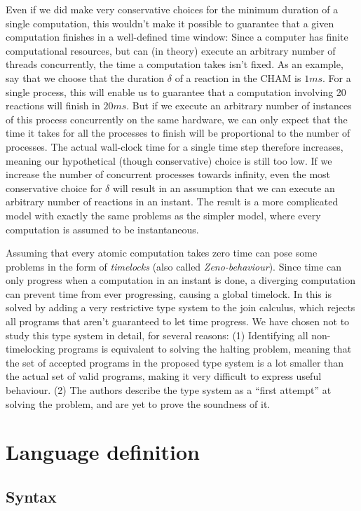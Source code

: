 Even if we did make very conservative choices for the minimum duration
of a single computation, this wouldn't make it possible to guarantee
that a given computation finishes in a well-defined time window: Since
a computer has finite computational resources, but can (in theory)
execute an arbitrary number of threads concurrently, the time a
computation takes isn't fixed. As an example, say that we choose that
the duration $\delta$ of a reaction in the CHAM is $1 ms$. For a
single process, this will enable us to guarantee that a computation
involving 20 reactions will finish in $20 ms$. But if we execute an
arbitrary number of instances of this process concurrently on the same
hardware, we can only expect that the time it takes for all the
processes to finish will be proportional to the number of processes.
The actual wall-clock time for a single time step therefore increases,
meaning our hypothetical (though conservative) choice is still too
low. If we increase the number of concurrent processes towards
infinity, even the most conservative choice for $\delta$ will result
in an assumption that we can execute an arbitrary number of reactions
in an instant. The result is a more complicated model with exactly the
same problems as the simpler model, where every computation is assumed
to be instantaneous.

Assuming that every atomic computation takes zero time can pose some
problems in the form of \emph{timelocks} (also called
\emph{Zeno-behaviour}). Since time can only progress when a
computation in an instant is done, a diverging computation can prevent
time from ever progressing, causing a global timelock.  In
\cite{timed-join} this is solved by adding a very restrictive type
system to the join calculus, which rejects all programs that aren't
guaranteed to let time progress. We have chosen not to study this type
system in detail, for several reasons: (1) Identifying all
non-timelocking programs is equivalent to solving the halting problem,
meaning that the set of accepted programs in the proposed type system
is a lot smaller than the actual set of valid programs, making it very
difficult to express useful behaviour. (2) The authors describe the
type system as a ``first attempt'' at solving the problem, and are yet
to prove the soundness of it.


\section{Language definition}

\subsection{Syntax}

